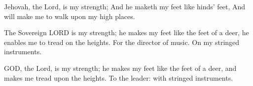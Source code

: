 			\begin{versebox}
					\item[BHS] 
					\item[LXX] 
					\item[ASV] Jehovah, the Lord, is my strength; And he maketh my feet like hinds' feet, And will make me to walk upon my high places.
					\item[NIV] The Sovereign LORD is my strength; he makes my feet like the feet of a deer, he enables me to tread on the heights. For the director of music. On my stringed instruments.
					\item[NRSV] GOD, the Lord, is my strength; he makes my feet like the feet of a deer, and makes me tread upon the heights. To the leader: with stringed instruments.
			\end{versebox}
